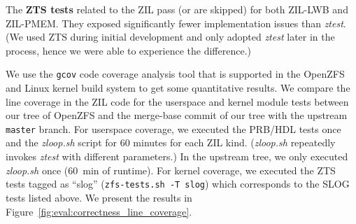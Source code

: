 \documentclass[12pt,a4paper,twoside]{book}
\begin{document}
The \textbf{ZTS tests} related to the ZIL pass (or are skipped) for both ZIL-LWB and ZIL-PMEM.
They exposed significantly fewer implementation issues than \textit{ztest}.
(We used ZTS during initial development and only adopted \textit{ztest} later in the process, hence we were able to experience the difference.)

We use the \lstinline{gcov} code coverage analysis tool that is supported in the OpenZFS and Linux kernel build system to get some quantitative results.
We compare the line coverage in the ZIL code for the userspace and kernel module tests between our tree of \mbox{OpenZFS} and the merge-base commit of our tree with the upstream \lstinline{master} branch.
For userspace coverage, we executed the PRB/HDL tests once and the \textit{zloop.sh} script for 60 minutes for each ZIL kind.
(\textit{zloop.sh} repeatedly invokes \textit{ztest} with different parameters.)
In the upstream tree, we only executed \textit{zloop.sh} once (60~min of runtime).
For kernel coverage, we executed the ZTS tests tagged as ``slog'' (\lstinline{zfs-tests.sh -T slog}) which corresponds to the SLOG tests listed above.
We present the results in Figure~\ref{fig:eval:correctness_line_coverage}.

\newcommand{\cssubheader}[1]{\multicolumn{1}{c}{ \rotatebox[origin=c]{0}{\footnotesize #1} } }
\end{document}
